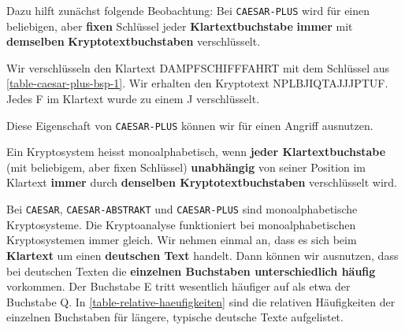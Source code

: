 Dazu hilft zunächst folgende Beobachtung: Bei \texttt{CAESAR-PLUS} wird für einen beliebigen, aber \textbf{fixen} Schlüssel jeder \textbf{Klartextbuchstabe} \textbf{immer} mit \textbf{demselben} \textbf{Kryptotextbuchstaben} verschlüsselt.

\begin{example}
Wir verschlüsseln den Klartext DAMPFSCHIFFFAHRT mit dem Schlüssel aus \autoref{table-caesar-plus-bsp-1}. Wir erhalten den Kryptotext NPLBJIQTAJJJPTUF. Jedes F im Klartext wurde zu einem J verschlüsselt.
\end{example}

Diese Eigenschaft von \texttt{CAESAR-PLUS} können wir für einen Angriff ausnutzen.

\begin{definition}
Ein Kryptosystem heisst monoalphabetisch, wenn \textbf{jeder Klartextbuchstabe} (mit beliebigem, aber fixen Schlüssel) \textbf{unabhängig} von seiner Position im Klartext \textbf{immer} durch \textbf{denselben Kryptotextbuchstaben} verschlüsselt wird.
\end{definition}

Bei \texttt{CAESAR}, \texttt{CAESAR-ABSTRAKT} und \texttt{CAESAR-PLUS} sind monoalphabetische Kryptosysteme. Die Kryptoanalyse funktioniert bei monoalphabetischen Kryptosystemen immer gleich. Wir nehmen einmal an, dass es sich beim \textbf{Klartext} um einen \textbf{deutschen Text} handelt. Dann können wir ausnutzen, dass bei deutschen Texten die \textbf{einzelnen Buchstaben unterschiedlich häufig} vorkommen. Der Buchstabe E tritt wesentlich häufiger auf als etwa der Buchstabe Q. In \autoref{table-relative-haeufigkeiten} sind die relativen Häufigkeiten der einzelnen Buchstaben für längere, typische deutsche Texte aufgelistet. 

